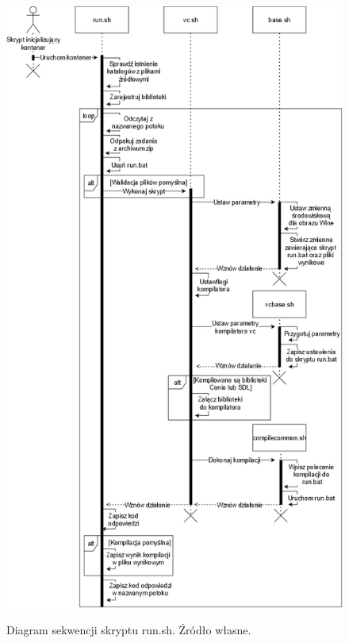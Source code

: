 \begin{figure}[!h]
	\begin{center}
		\resizebox{0.8\textwidth}{!} {
			\includegraphics{img/2/run.png}
		}
		\caption[Diagram sekwencji skryptu run.sh]{Diagram sekwencji skryptu run.sh. Źródło własne.}
		\label{run}
	\end{center}
\end{figure}


